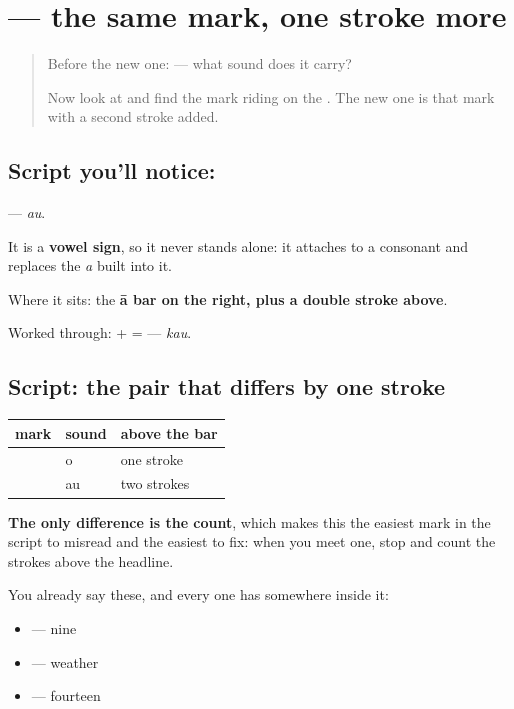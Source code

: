 \section[\texorpdfstring{\hi{ौ} (au)}{ौ (au)}]{ — the same mark, one stroke more}

\label{lesson:HI-S134-vowel-sign-au}



\begin{quote}
Before the new one: \textbf{} — what sound does it carry?

Now look at \textbf{} and find the mark riding on the \textbf{}. The new one is that mark with a second stroke added.
\end{quote}

\subsection*{Script you'll notice: }
\textbf{} — \emph{au}.

It is a \textbf{vowel sign}, so it never stands alone: it attaches to a consonant and replaces the \emph{a} built into it.

Where it sits: the \textbf{ā bar on the right, plus a double stroke above}.

Worked through: \textbf{} + \textbf{} = \textbf{} — \emph{kau}.

\subsection*{Script: the pair that differs by one stroke}
\noindent
\begin{tabularx}{\linewidth}{@{}>{\raggedright\arraybackslash}X>{\raggedright\arraybackslash}X>{\raggedright\arraybackslash}X@{}}
\toprule
\textbf{mark} & \textbf{sound} & \textbf{above the bar} \\
\midrule
\hi{◌ो} & o & one stroke \\
\hi{◌ौ} & au & two strokes \\
\bottomrule
\end{tabularx}

\textbf{The only difference is the count}, which makes this the easiest mark in the script to misread and the easiest to fix: when you meet one, stop and count the strokes above the headline.

You already say these, and every one has \textbf{} somewhere inside it:

\begin{itemize}
\raggedright
  \item \textbf{} — nine
  \item \textbf{} — weather
  \item \textbf{} — fourteen
\end{itemize}

